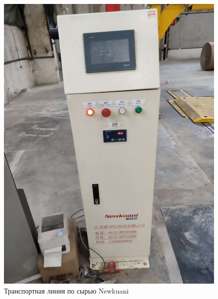\begin{figure}
\begin{center}
  \includegraphics[height=0.4\textheight, width=\textwidth, keepaspectratio]{Pics/d_Newkuani.JPEG}
\end{center}
  \caption{Транспортная линия по сырью Newkuani}
  \label{pic:d_Newkuani}
\end{figure}


